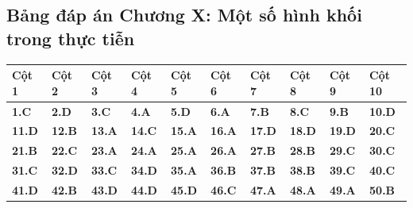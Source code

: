 \documentclass[11pt,a4paper]{article}
\begin{document}
\subsection*{\color{primary} Bảng đáp án Chương X: Một số hình khối trong thực tiễn}
\begin{center}
\renewcommand{\arraystretch}{1.25}
\begin{tabularx}{\textwidth}{*{10}{>{\centering\arraybackslash}X}}
\toprule
\textbf{\color{primary} Cột 1} & \textbf{\color{primary} Cột 2} & \textbf{\color{primary} Cột 3} & \textbf{\color{primary} Cột 4} & \textbf{\color{primary} Cột 5} & \textbf{\color{primary} Cột 6} & \textbf{\color{primary} Cột 7} & \textbf{\color{primary} Cột 8} & \textbf{\color{primary} Cột 9} & \textbf{\color{primary} Cột 10} \\
\midrule
\textbf{1.C} & \textbf{2.D} & \textbf{3.C} & \textbf{4.A} & \textbf{5.D} & \textbf{6.A} & \textbf{7.B} & \textbf{8.C} & \textbf{9.B} & \textbf{10.D} \\
\rowcolor{rowtint} \textbf{11.D} & \textbf{12.B} & \textbf{13.A} & \textbf{14.C} & \textbf{15.A} & \textbf{16.A} & \textbf{17.D} & \textbf{18.D} & \textbf{19.D} & \textbf{20.C} \\
\textbf{21.B} & \textbf{22.C} & \textbf{23.A} & \textbf{24.A} & \textbf{25.A} & \textbf{26.A} & \textbf{27.B} & \textbf{28.B} & \textbf{29.C} & \textbf{30.C} \\
\rowcolor{rowtint} \textbf{31.C} & \textbf{32.D} & \textbf{33.C} & \textbf{34.D} & \textbf{35.A} & \textbf{36.B} & \textbf{37.B} & \textbf{38.B} & \textbf{39.C} & \textbf{40.C} \\
\textbf{41.D} & \textbf{42.B} & \textbf{43.D} & \textbf{44.D} & \textbf{45.D} & \textbf{46.C} & \textbf{47.A} & \textbf{48.A} & \textbf{49.A} & \textbf{50.B} \\
\bottomrule
\end{tabularx}
\end{center}\vspace{10pt}
\end{document}
